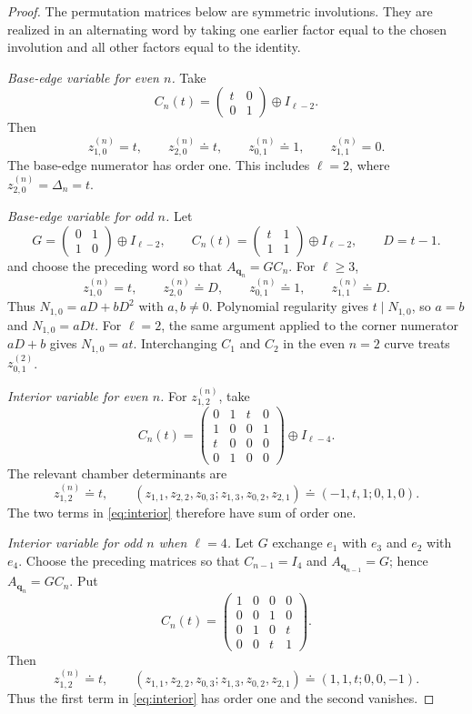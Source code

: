 \documentclass[11pt]{amsart}
\theoremstyle{definition}
\theoremstyle{remark}
\begin{document}
\begin{proof}
The permutation matrices below are symmetric involutions.  They are
realized in an alternating word by taking one earlier factor equal to the
chosen involution and all other factors equal to the identity.

\smallskip
\noindent\emph{Base-edge variable for even $n$.}
Take
\[ C_n(t)=\begin{pmatrix}t&0\\0&1\end{pmatrix}\oplus I_{\ell-2}. \]
Then
\[ z_{1,0}^{(n)}=t,\qquad z_{2,0}^{(n)}\doteq t, \qquad z_{0,1}^{(n)}\doteq1, \qquad z_{1,1}^{(n)}=0. \]
The base-edge numerator has order one.  This includes $\ell=2$, where
$z_{2,0}^{(n)}=\Delta_n=t$.

\smallskip
\noindent\emph{Base-edge variable for odd $n$.}
Let
\[ G=\begin{pmatrix}0&1\\1&0\end{pmatrix}\oplus I_{\ell-2}, \qquad C_n(t)=\begin{pmatrix}t&1\\1&1\end{pmatrix}\oplus I_{\ell-2}, \qquad D=t-1. \]
and choose the preceding word so that $A_{\mathbf q_n}=GC_n$.  For
$\ell\ge3$,
\[ z_{1,0}^{(n)}=t, \qquad z_{2,0}^{(n)}\doteq D, \qquad z_{0,1}^{(n)}\doteq1, \qquad z_{1,1}^{(n)}\doteq D. \]
Thus $N_{1,0}=aD+bD^2$ with $a,b\ne0$.  Polynomial regularity gives
$t\mid N_{1,0}$, so $a=b$ and $N_{1,0}=aDt$.  For $\ell=2$, the same
argument applied to the corner numerator $aD+b$ gives $N_{1,0}=at$.
Interchanging $C_1$ and $C_2$ in the even $n=2$ curve treats
$z_{0,1}^{(2)}$.

\smallskip
\noindent\emph{Interior variable for even $n$.}
For $z_{1,2}^{(n)}$, take
\[
 C_n(t)=
 \begin{pmatrix}
  0&1&t&0\\
  1&0&0&1\\
  t&0&0&0\\
  0&1&0&0
 \end{pmatrix}\oplus I_{\ell-4}.
\]
The relevant chamber determinants are
\[ z_{1,2}^{(n)}\doteq t, \qquad (z_{1,1},z_{2,2},z_{0,3};z_{1,3},z_{0,2},z_{2,1}) \doteq(-1,t,1;0,1,0). \]
The two terms in \eqref{eq:interior} therefore have sum of order one.

\smallskip
\noindent\emph{Interior variable for odd $n$ when $\ell=4$.}
Let $G$ exchange $e_1$ with $e_3$ and $e_2$ with $e_4$.  Choose the preceding
matrices so that $C_{n-1}=I_4$ and $A_{\mathbf q_{n-1}}=G$; hence
$A_{\mathbf q_n}=GC_n$.  Put
\[
 C_n(t)=
 \begin{pmatrix}
  1&0&0&0\\
  0&0&1&0\\
  0&1&0&t\\
  0&0&t&1
 \end{pmatrix}.
\]
Then
\[ z_{1,2}^{(n)}\doteq t, \qquad (z_{1,1},z_{2,2},z_{0,3};z_{1,3},z_{0,2},z_{2,1}) \doteq(1,1,t;0,0,-1). \]
Thus the first term in \eqref{eq:interior} has order one and the second
vanishes.


\end{proof}
\end{document}
